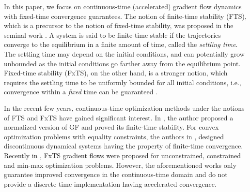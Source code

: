 \documentclass[letterpaper]{article}
\begin{document}



In this paper, we focus on continuous-time (accelerated) gradient flow dynamics with fixed-time convergence guarantees. The notion of finite-time stability (FTS), which is a precursor to the notion of fixed-time stability, was proposed in the seminal work \cite{bhat2000}. A system is said to be finite-time stable if the trajectories converge to the equilibrium in a finite amount of time, called the {\it settling time}. The settling time may depend on the initial conditions, and can potentially grow unbounded as the initial conditions go farther away from the equilibrium point. Fixed-time stability (FxTS), on the other hand, is a stronger notion, which requires the settling time to be uniformly bounded for all initial conditions, i.e., convergence within a \textit{fixed} time can be guaranteed \cite{polyakov2011nonlinear}. 

In the recent few years, continuous-time optimization methods under the notions of FTS and FxTS have gained significant interest. In \cite{cortes2006}, the author proposed a normalized version of GF and proved its finite-time stability. For convex optimization problems with equality constraints, the authors in \cite{chen2018}, designed discontinuous dynamical systems having the property of finite-time convergence. Recently in \cite{kunal2021}, FxTS gradient flows were proposed for unconstrained, constrained and min-max optimization problems. However, the aforementioned works only guarantee improved convergence in the continuous-time domain and do not provide a discrete-time implementation having accelerated convergence.
\end{document}

